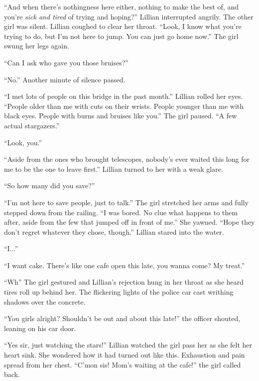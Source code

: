\begin{Standard}
``And when there's nothingness here either, nothing to make the best of, and you're \emph{sick and tired}
of trying and hoping?'' Lillian interrupted angrily. The other girl was silent. Lillian
coughed to clear her throat. ``Look, I know what you're trying to do, but I'm not
here to jump. You can just go home now.'' The girl swung her legs again.

``Can I ask who gave you those bruises?''

``No.'' Another minute of silence passed.

``I met lots of people on this bridge in the past month.'' Lillian rolled her eyes.
``People older than me with cuts on their wrists. People younger than me with black eyes.
People with burns and bruises like you.'' The girl paused. ``A few actual stargazers.''

``Look, you.''

``Aside from the ones who brought telescopes, nobody's ever waited this long for me
to be the one to leave first.'' Lillian turned to her with a weak glare.

``So how many did you save?''

``I'm not here to save people, just to talk.'' The girl stretched her arms and fully
stepped down from the railing. ``I was bored. No clue what happens to them after,
aside from the few that jumped off in front of me.'' She yawned. ``Hope they don't
regret whatever they chose, though.'' Lillian stared into the water.

``I...''

``I want cake. There's like one cafe open this late, you wanna come? My treat.''

``Wh\textemdash{}'' The girl gestured and Lillian's rejection hung in her throat
as she heard tires roll up behind her. The flickering lights of the police car cast
writhing shadows over the concrete.

``You girls alright? Shouldn't be out and about this late!'' the officer shouted,
leaning on his car door.

``Yes sir, just watching the stars!'' Lillian watched the girl pass her as she felt
her heart sink. She wondered how it had turned out like this. Exhaustion and pain
spread from her chest. ``C'mon sis! Mom's waiting at the cafe!'' the girl called back.
\end{Standard}
